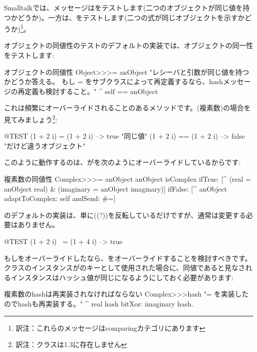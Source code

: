 \documentclass[a4paper,10pt,twoside]{book}
\begin{document}
Smalltalkでは、\ct{=}メッセージはをテストします(\ie 二つのオブジェクトが同じ値を持つかどうか)。一方\ct{==}は、をテストします(\ie 二つの式が同じオブジェクトを示すかどうか)\footnote{訳注：これらのメッセージはcomparingカテゴリにあります}。

オブジェクトの同値性のテストのデフォルトの実装では、オブジェクトの同一性をテストします:
\begin{method}{オブジェクトの同値性}
Object>>>= anObject
    "レシーバと引数が同じ値を持つかどうか答える。
    もし = をサブクラスによって再定義するなら、hashメッセージの再定義も検討すること。"
    ^ self == anObject
\end{method}

これは頻繁にオーバーライドされることのあるメソッドです。(複素数)の場合を見てみましょう\footnote{訳注：クラスは\pharo 1.3に存在しません}:

\begin{code}{@TEST}
(1 + 2 i) = (1 + 2 i)   --> true     "同じ値"
(1 + 2 i) == (1 + 2 i) --> false    "だけど違うオブジェクト"
\end{code}

このように動作するのは、が\ct{=}を次のようにオーバーライドしているからです:
\begin{method}{複素数の同値性}
Complex>>>= anObject
    anObject isComplex
        ifTrue: [^ (real = anObject real) & (imaginary = anObject imaginary)]
        ifFalse: [^ anObject adaptToComplex: self andSend: #=]
\end{method}

のデフォルトの実装は、単に((?\ct{=}))を反転しているだけですが、通常は変更する必要はありません。

\begin{code}{@TEST}
(1 + 2 i) ~= (1 + 4 i) --> true
\end{code}

もし\ct{=}をオーバーライドしたなら、をオーバーライドすることを検討すべきです。クラスのインスタンスがのキーとして使用された場合に、同値であると見なされるインスタンスはハッシュ値が同じになるようにしておく必要があります:
\begin{method}{複素数のhashは再実装されなければならない}
Complex>>>hash
    "= を実装したのでhashも再実装する。"
    ^ real hash bitXor: imaginary hash.
\end{method}
\end{document}
